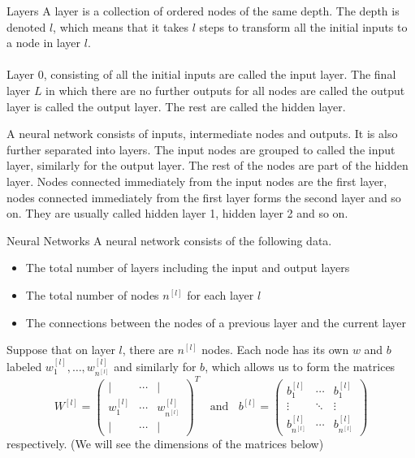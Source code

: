 \documentclass[a4paper]{article}
\begin{document}
\begin{defn}{Layers}{} A layer is a collection of ordered nodes of the same depth. The depth is denoted $l$, which means that it takes $l$ steps to transform all the initial inputs to a node in layer $l$. \\~\\
Layer $0$, consisting of all the initial inputs are called the input layer. The final layer $L$ in which there are no further outputs for all nodes are called the output layer is called the output layer. The rest are called the hidden layer. 
\end{defn}

A neural network consists of inputs, intermediate nodes and outputs. It is also further separated into layers. The input nodes are grouped to called the input layer, similarly for the output layer. The rest of the nodes are part of the hidden layer. Nodes connected immediately from the input nodes are the first layer, nodes connected immediately from the first layer forms the second layer and so on. They are usually called hidden layer 1, hidden layer 2 and so on. 

\begin{defn}{Neural Networks}{} A neural network consists of the following data. 
\begin{itemize}
\item The total number of layers including the input and output layers
\item The total number of nodes $n^{[l]}$ for each layer $l$
\item The connections between the nodes of a previous layer and the current layer
\end{itemize}
\end{defn}

Suppose that on layer $l$, there are $n^{[l]}$ nodes. Each node has its own $w$ and $b$ labeled $w_1^{[l]},\dots,w_{n^{[l]}}^{[l]}$ and similarly for $b$, which allows us to form the matrices $$W^{[l]}=\begin{pmatrix}
| & \cdots & |\\
w_1^{[l]} & \cdots & w_{n^{[l]}}^{[l]}\\
| & \cdots & |
\end{pmatrix}^T\;\;\text{ and }\;\;b^{[l]}=\begin{pmatrix}
b_1^{[l]} & \cdots & b_1^{[l]}\\
\vdots & \ddots & \vdots\\
b_{n^{[l]}}^{[l]} & \cdots & b_{n^{[l]}}^{[l]}
\end{pmatrix}$$ respectively. (We will see the dimensions of the matrices below) \\~\\
\end{document}
